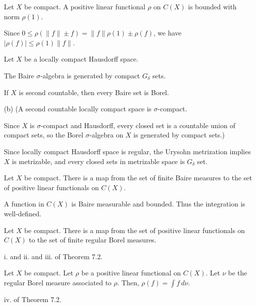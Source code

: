 \documentclass{../../large}
\begin{document}
\begin{prb}
Let $X$ be compact.
A positive linear functional $\rho$ on $C(X)$ is bounded with norm $\rho(1)$.
\end{prb}
\begin{pf}
Since $0\le\rho(\|f\|\pm f)=\|f\|\rho(1)\pm\rho(f)$, we have $|\rho(f)|\le\rho(1)\|f\|$.
\end{pf}

\begin{prb}
Let $X$ be a locally compact Hausdorff space.
\begin{parts}
\item The Baire $\sigma$-algebra is generated by compact $G_\delta$ sets.
\item If $X$ is second countable, then every Baire set is Borel.
\end{parts}
\end{prb}
\begin{sol}
(b)
(A second countable locally compact space is $\sigma$-compact.

Since $X$ is $\sigma$-compact and Hausdorff, every closed set is a countable union of compact sets, so the Borel $\sigma$-algebra on $X$ is generated by compact sets.)

Since locally compact Hausdorff space is regular, the Urysohn metrization implies $X$ is metrizable, and every closed sets in metrizable space is $G_\delta$ set.
\end{sol}



\begin{prb}
Let $X$ be compact.
There is a map from the set of finite Baire measures to the set of positive linear functionals on $C(X)$.
\end{prb}
\begin{sol}
A function in $C(X)$ is Baire measurable and bounded.
Thus the integration is well-defined.
\end{sol}

\begin{prb}
Let $X$ be compact.
There is a map from the set of positive linear functionals on $C(X)$ to the set of finite regular Borel measures.
\end{prb}
\begin{sol}
i. and ii. and iii. of Theorem 7.2.
\end{sol}

\begin{prb}
Let $X$ be compact.
Let $\rho$ be a positive linear functional on $C(X)$.
Let $\nu$ be the regular Borel measure associated to $\rho$.
Then, $\rho(f)=\int f\,d\nu$.
\end{prb}
\begin{sol}
iv. of Theorem 7.2.
\end{sol}
\end{document}
